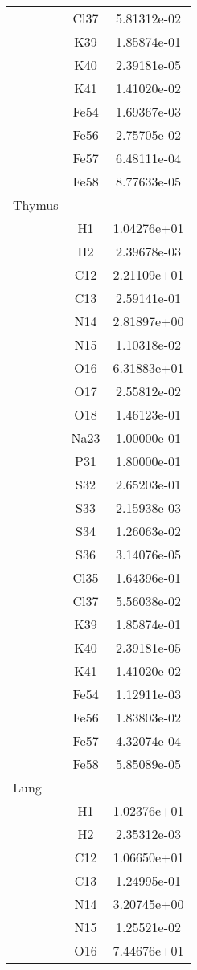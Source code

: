 \begin{centering}
\begin{longtable}{l c c}
& Cl37 & 5.81312e-02 \\ 
& K39 & 1.85874e-01 \\ 
& K40 & 2.39181e-05 \\ 
& K41 & 1.41020e-02 \\ 
& Fe54 & 1.69367e-03 \\ 
& Fe56 & 2.75705e-02 \\ 
& Fe57 & 6.48111e-04 \\ 
& Fe58 & 8.77633e-05 \\ 
\hline
Thymus & & \\
\hline
& H1 & 1.04276e+01 \\ 
& H2 & 2.39678e-03 \\ 
& C12 & 2.21109e+01 \\ 
& C13 & 2.59141e-01 \\ 
& N14 & 2.81897e+00 \\ 
& N15 & 1.10318e-02 \\ 
& O16 & 6.31883e+01 \\ 
& O17 & 2.55812e-02 \\ 
& O18 & 1.46123e-01 \\ 
& Na23 & 1.00000e-01 \\ 
& P31 & 1.80000e-01 \\ 
& S32 & 2.65203e-01 \\ 
& S33 & 2.15938e-03 \\ 
& S34 & 1.26063e-02 \\ 
& S36 & 3.14076e-05 \\ 
& Cl35 & 1.64396e-01 \\ 
& Cl37 & 5.56038e-02 \\ 
& K39 & 1.85874e-01 \\ 
& K40 & 2.39181e-05 \\ 
& K41 & 1.41020e-02 \\ 
& Fe54 & 1.12911e-03 \\ 
& Fe56 & 1.83803e-02 \\ 
& Fe57 & 4.32074e-04 \\ 
& Fe58 & 5.85089e-05 \\ 
\hline
Lung & & \\
\hline
& H1 & 1.02376e+01 \\ 
& H2 & 2.35312e-03 \\ 
& C12 & 1.06650e+01 \\ 
& C13 & 1.24995e-01 \\ 
& N14 & 3.20745e+00 \\ 
& N15 & 1.25521e-02 \\ 
& O16 & 7.44676e+01 \\ 

\end{longtable}
\end{centering}
